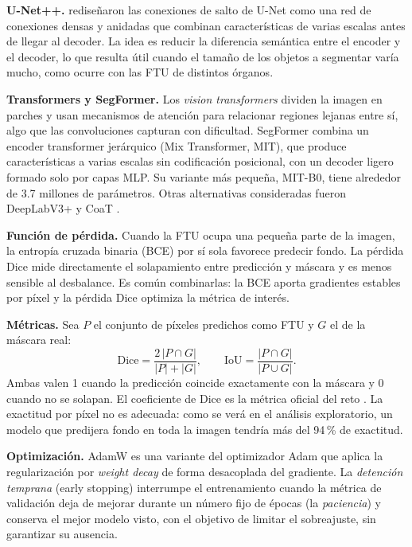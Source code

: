 \documentclass[11pt,letterpaper]{article}
\begin{document}
\textbf{U-Net++.} \textcite{zhou2020unetpp} rediseñaron las conexiones de salto de U-Net como una red
de conexiones densas y anidadas que combinan características de varias escalas antes de llegar al
decoder. La idea es reducir la diferencia semántica entre el encoder y el decoder, lo que resulta útil
cuando el tamaño de los objetos a segmentar varía mucho, como ocurre con las FTU de distintos órganos.

\textbf{Transformers y SegFormer.} Los \emph{vision transformers} dividen la imagen en parches y usan
mecanismos de atención para relacionar regiones lejanas entre sí, algo que las convoluciones capturan
con dificultad. SegFormer \parencite{xie2021segformer} combina un encoder transformer jerárquico (Mix
Transformer, MIT), que produce características a varias escalas sin codificación posicional, con un
decoder ligero formado solo por capas MLP. Su variante más pequeña, MIT-B0, tiene alrededor de 3.7
millones de parámetros. Otras alternativas consideradas fueron DeepLabV3+ \parencite{chen2018deeplabv3plus}
y CoaT \parencite{xu2021coat}.

\textbf{Función de pérdida.} Cuando la FTU ocupa una pequeña parte de la imagen, la entropía cruzada
binaria (BCE) por sí sola favorece predecir fondo. La pérdida Dice \parencite{milletari2016vnet} mide
directamente el solapamiento entre predicción y máscara y es menos sensible al desbalance. Es común
combinarlas: la BCE aporta gradientes estables por píxel y la pérdida Dice optimiza la métrica de
interés.

\textbf{Métricas.} Sea $P$ el conjunto de píxeles predichos como FTU y $G$ el de la máscara real:
\begin{equation*}
\text{Dice} = \frac{2\,|P \cap G|}{|P| + |G|}, \qquad
\text{IoU} = \frac{|P \cap G|}{|P \cup G|}.
\end{equation*}
Ambas valen 1 cuando la predicción coincide exactamente con la máscara y 0 cuando no se solapan. El
coeficiente de Dice es la métrica oficial del reto \parencite{jain2023hacking}. La exactitud por píxel
no es adecuada: como se verá en el análisis exploratorio, un modelo que predijera fondo en toda la
imagen tendría más del 94\,\% de exactitud.

\textbf{Optimización.} AdamW \parencite{loshchilov2019adamw} es una variante del optimizador Adam que
aplica la regularización por \emph{weight decay} de forma desacoplada del gradiente. La
\emph{detención temprana} (early stopping) interrumpe el entrenamiento cuando la métrica de validación
deja de mejorar durante un número fijo de épocas (la \emph{paciencia}) y conserva el mejor modelo
visto, con el objetivo de limitar el sobreajuste, sin garantizar su ausencia.
\end{document}
